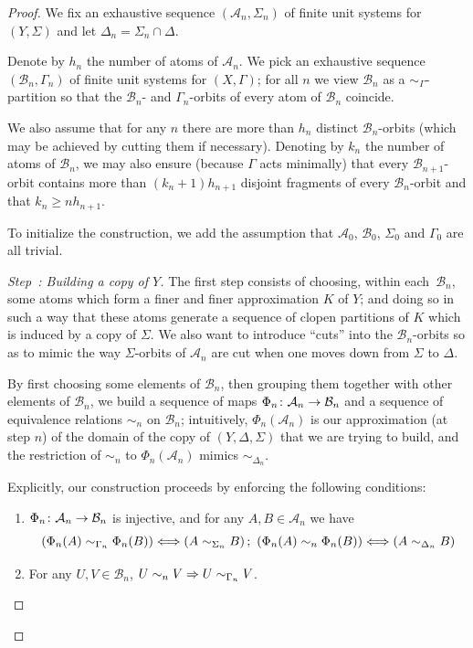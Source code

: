 \documentclass[AHL,Unicode]{cedram}
\newcommand{\mcA}{\mathcal{A}}
\newcommand{\mcB}{\mathcal{B}}
\newcounter{setofstep}
\newcounter{step}[setofstep]
\newenvironment{step}[1][]{\refstepcounter{step}\begin{proof}[{Step~\thestep\if#1\empty\else: #1\fi}]}{\let\qed\relax\end{proof}}
\renewcommand*{\to}{\mathchoice{\longrightarrow}{\rightarrow}{\rightarrow}{\rightarrow}}
\newcommand*{\To}{\mathchoice{\Longrightarrow}{\Rightarrow}{\Rightarrow}{\Rightarrow}}
\let\oldLeftrightarrow\Leftrightarrow
\renewcommand*{\Leftrightarrow}{\mathchoice{\Longleftrightarrow}{\oldLeftrightarrow}{\oldLeftrightarrow}{\oldLeftrightarrow}}
\begin{document}
\begin{proof}
We fix an exhaustive sequence $(\mcA_n,\Sigma_n)$ of finite unit systems for $(Y,\Sigma)$ and let $\Delta_n=\Sigma_n \cap \Delta$.

Denote by $h_n$ the number of atoms of $\mcA_n$. We pick an exhaustive sequence $(\mcB_n,\Gamma_n)$ of finite unit systems for $(X,\Gamma)$; for all $n$ we view $\mcB_n$ as a $\sim_\Gamma$-partition so that the $\mcB_n$- and $\Gamma_n$-orbits of every atom of $\mcB_n$ coincide.

We also assume that for any $n$ there are more than $h_n$ distinct $\mcB_n$-orbits (which may be achieved by cutting them if necessary). Denoting by $k_n$ the number of atoms of $\mcB_n$, we may also ensure (because $\Gamma$ acts minimally) that every $\mcB_{n+1}$-orbit contains more than $(k_n+1)h_{n+1}$ disjoint fragments of every $\mcB_n$-orbit and that $k_{n} \ge n h_{n+1}$.

To initialize the construction, we add the assumption that $\mcA_0$, $\mcB_0$, $\Sigma_0$ and $\Gamma_0$ are all trivial.


\begin{step}[{Building a copy of $Y$}]\label{step1}
The first step consists of choosing, within each~$\mcB_n$, some atoms which form a finer and finer approximation $K$ of $Y$; and doing so in such a way that these atoms generate a sequence of clopen partitions of $K$ which is induced by a copy of $\Sigma$. We also want to introduce ``cuts'' into the $\mcB_n$-orbits so as to mimic the way $\Sigma$-orbits of $\mcA_n$ are cut when one moves down from $\Sigma$ to $\Delta$.


By first choosing some elements of $\mcB_n$, then grouping them together with other elements of $\mcB_n$, we build a sequence of maps $\Phi_n \colon \mcA_n \to \mcB_n$ and a sequence of equivalence relations $\sim_n$ on $\mcB_n$; intuitively, $\Phi_n(\mcA_n)$ is our approximation (at step $n$) of the domain of the copy of $(Y,\Delta,\Sigma)$ that we are trying to build, and the restriction of $\sim_n$ to $\Phi_n(\mcA_n)$ mimics $\sim_{\Delta_n}$.

\pagebreak
Explicitly, our construction proceeds by enforcing the following conditions:
\begin{enumerate}
\item $\Phi_n \colon \mcA_n \to \mcB_n$ is injective, and for any $A,B \in \mcA_n$ we have
\[
\left(\Phi_n(A) \sim_{\Gamma_n} \Phi_n(B)\right) \Leftrightarrow (A \sim_{\Sigma_n} B) \, ; \ \left(\Phi_n(A) \sim_n \Phi_n(B)\right) \Leftrightarrow (A \sim_{\Delta_n} B)
\]
\item For any $U,V \in \mcB_n$, $U \sim_n V \To U \sim_{\Gamma_n} V$.


\end{enumerate}
\end{step}
\end{proof}
\end{document}
